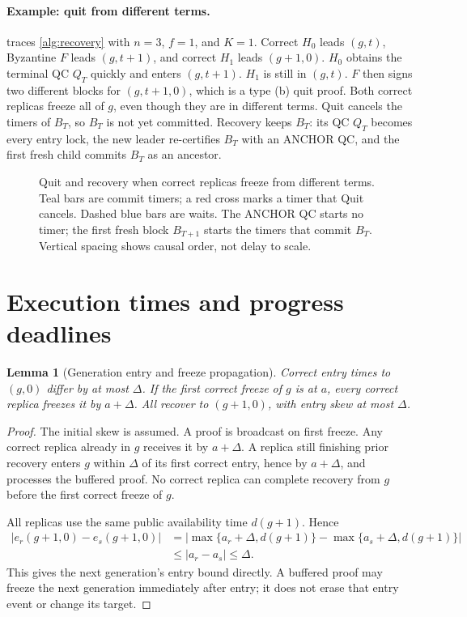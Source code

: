 \documentclass[11pt,a4paper]{article}
\newtheorem{lemma}[lemma]{Lemma}
\begin{document}
\paragraph{Example: quit from different terms.}
 traces \cref{alg:recovery} with $n=3$, $f=1$, and $K=1$.
Correct $H_0$ leads $(g,t)$, Byzantine $F$ leads $(g,t+1)$, and correct
$H_1$ leads $(g+1,0)$. $H_0$ obtains the terminal QC $Q_T$ quickly and
enters $(g,t+1)$. $H_1$ is still in $(g,t)$. $F$ then signs two different
blocks for $(g,t+1,0)$, which is a type (b) quit proof. Both correct
replicas freeze all of $g$, even though they are in different terms. Quit
cancels the timers of $B_T$, so $B_T$ is not yet committed. Recovery keeps
$B_T$: its QC $Q_T$ becomes every entry lock, the new leader re-certifies
$B_T$ with an ANCHOR QC, and the first fresh child commits $B_T$ as an
ancestor.

\begin{figure}[htbp]\centering

\caption{Quit and recovery when correct replicas freeze from different
terms. Teal bars are commit timers; a red cross marks a timer that Quit
cancels. Dashed blue bars are waits. The ANCHOR QC starts no timer; the first fresh block $B_{T+1}$
starts the timers that commit $B_T$. Vertical spacing shows causal order,
not delay to scale.}
\label{fig:quit}
\end{figure}

\section{Execution times and progress deadlines}
\label{sec:timing}
\begin{lemma}[Generation entry and freeze propagation]
\label{lem:entry}
Correct entry times to $(g,0)$ differ by at most $\Delta$. If the first
correct freeze of $g$ is at $a$, every correct replica freezes it by
$a+\Delta$. All recover to $(g+1,0)$, with entry skew at most $\Delta$.
\end{lemma}
\begin{proof}
The initial skew is assumed. A proof is broadcast on first freeze.
Any correct replica already in $g$ receives it by $a+\Delta$.
A replica still finishing prior recovery enters $g$ within $\Delta$
of its first correct entry, hence by $a+\Delta$, and processes the
buffered proof. No correct replica can complete recovery from $g$ before
the first correct freeze of $g$.

All replicas use the same public availability time $d(g+1)$. Hence
\[
\begin{aligned}
 |e_r(g+1,0)-e_s(g+1,0)|
 &=\big|\max\{a_r+\Delta,d(g+1)\}
          -\max\{a_s+\Delta,d(g+1)\}\big|\\
 &\le |a_r-a_s|\le\Delta.
\end{aligned}
\]
This gives the next generation's entry bound directly.
A buffered proof may freeze the next generation immediately after entry;
it does not erase that entry event or change its target.
\end{proof}
\end{document}
